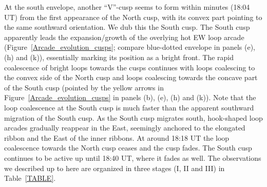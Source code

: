 \documentclass[preprint]{aastex}
\begin{document}
At the south envelope, another ``V''-cusp seems to form within minutes (18:04 UT) from the first appearance of the North cusp, with its convex part pointing to the same southward orientation. We dub this the South cusp. The South cusp apparently leads the expansion/growth of the overlying hot EW loop arcade (Figure~\ref{Arcade_evolution_cusps}; compare blue-dotted envelope in panels (e), (h) and (k)), essentially marking its position as a bright front. The rapid coalescence of bright loops towards the cusps continues with loops coalescing to the convex side of the North cusp and loops coalescing towards the concave part of the South cusp (pointed by the yellow arrows in Figure~\ref{Arcade_evolution_cusps} in panels (b), (e), (h) and (k)). Note that the loop coalescence at the South cusp is much faster than the apparent southward migration of the South cusp. As the South cusp migrates south, hook-shaped loop arcades gradually reappear in the East, seemingly anchored to the elongated ribbon and the East of the inner ribbons. At around 18:18 UT the loop coalescence towards the North cusp ceases and the cusp fades. The South cusp continues to be active up until 18:40 UT, where it fades as well. The observations we described up to here are organized in three stages (I, II and III) in Table~\ref{TABLE}.

\begin{figure*}
\caption{Multipanel figure organized in wavelengths (columns of 94\,\AA, 131\,\AA\ and 1400\,\AA) at four different times (rows) summarizing the observations. The small FOV of 1400\,\AA\ is complemented by the respective 131\,\AA\ images. See text for discussion. A movie of this figure is available in the online version of the journal (``movie2.mp4'').}
\label{Arcade_evolution_cusps}
\end{figure*}
\end{document}
